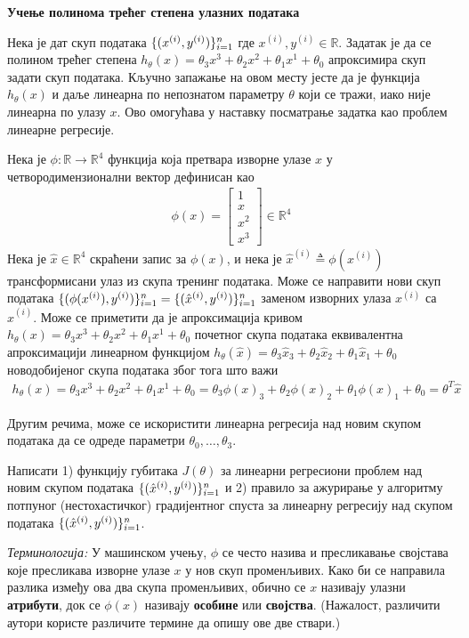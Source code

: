\item {} {\bf Учење полинома трећег степена улазних података}

Нека је дат скуп података $\{(x^{(i)}, y^{(i)})\}_{i=1}^{{n}}$ где $x^{(i)}, y^{(i)} \in \mathbb{R}$. Задатак је да се полином трећег степена $h_{\theta}(x) = \theta_3x^3 + \theta_2x^2 + \theta_1x^1 + \theta_0$ апроксимира скуп задати скуп података. Кључно запажање на овом месту јесте да је функција $h_{\theta}(x)$ и даље линеарна по непознатом параметру $\theta$ који се тражи, иако није линеарна по улазу $x$. Ово омогућава у наставку посматрање задатка као проблем линеарне регресије.

Нека је $\phi:\mathbb{R}\rightarrow \mathbb{R}^4$ функција која претвара изворне улазе $x$ у четвородимензионални вектор дефинисан као
\begin{align}
\phi(x) = \left[\begin{array}{c} 1\\ x \\ x^2 \\ x^3 \end{array}\right]\in \mathbb{R}^4 \label{eqn:feature}
\end{align}
Нека је $\hat{x}\in \mathbb{R}^4$ скраћени запис за $\phi(x)$, и нека је $\hat{x}^{(i)} \triangleq \phi(x^{(i)})$ трансформисани улаз из скупа тренинг података. Може се направити нови скуп података $\{(\phi(x^{(i)}), y^{(i)})\}_{i=1}^{{n}} = \{(\hat{x}^{(i)}, y^{(i)})\}_{i=1}^{{n}}$ заменом изворних улаза $x^{(i)}$ са $\hat{x}^{(i)}$. Може се приметити да је апроксимација кривом $h_{\theta}(x) = \theta_3x^3 + \theta_2x^2 + \theta_1x^1 + \theta_0$ почетног скупа података еквивалентна апроксимацији линеарном функцијом $h_{\theta}(\hat{x}) = \theta_3\hat{x}_3 +  \theta_2\hat{x}_2 + \theta_1\hat{x}_1 + \theta_0$ новодобијеног скупа података због тога што важи
\begin{align}
h_\theta(x) =  \theta_3x^3 + \theta_2x^2 + \theta_1x^1 + \theta_0 =  \theta_3 \phi(x)_3 + \theta_2\phi(x)_2 + \theta_1\phi(x)_1 + \theta_0 = \theta^T \hat{x}
\end{align}

Другим речима, може се искористити линеарна регресија над  новим скупом података да се одреде параметри $\theta_0,\dots, \theta_3$.

Написати 1) функцију губитака $J(\theta)$ за линеарни регресиони проблем над новим скупом података $\{(\hat{x}^{(i)}, y^{(i)})\}_{i=1}^{{n}}$ и 2) правило за ажурирање у алгоритму потпуног (нестохастичког) градијентног спуста за линеарну регресију над скупом података $\{(\hat{x}^{(i)}, y^{(i)})\}_{i=1}^{{n}}$.

\textit{Терминологија:} У машинском учењу, $\phi$ се често назива и пресликавање својстава које пресликава изворне улазе $x$ у нов скуп променљивих. Како би се направила разлика између ова два скупа променљивих, обично се $x$ називају улазни {\bf атрибути}, док се $\phi(x)$ називају {\bf особине} или {\bf својства}. (Нажалост, различити аутори користе различите термине да опишу ове две ствари.)

